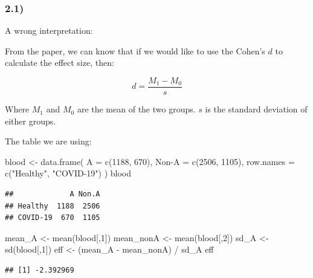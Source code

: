 \documentclass[
]{article}
\newenvironment{Shaded}{\begin{snugshade}}{\end{snugshade}}
\newcommand{\AttributeTok}[1]{\textcolor[rgb]{0.77,0.63,0.00}{#1}}
\newcommand{\DecValTok}[1]{\textcolor[rgb]{0.00,0.00,0.81}{#1}}
\newcommand{\FunctionTok}[1]{\textcolor[rgb]{0.00,0.00,0.00}{#1}}
\newcommand{\NormalTok}[1]{#1}
\newcommand{\OtherTok}[1]{\textcolor[rgb]{0.56,0.35,0.01}{#1}}
\newcommand{\SpecialCharTok}[1]{\textcolor[rgb]{0.00,0.00,0.00}{#1}}
\newcommand{\StringTok}[1]{\textcolor[rgb]{0.31,0.60,0.02}{#1}}
\begin{document}
\hypertarget{section-5}{%
\subsubsection{2.1)}\label{section-5}}

A wrong interpretation:

From the paper, we can know that if we would like to use the Cohen's
\(d\) to calculate the effect size, then:

\[
d = \frac{M_1 - M_0}{s}
\]

Where \(M_1\) and \(M_0\) are the mean of the two groups. \(s\) is the
standard deviation of either groups.

The table we are using:

\begin{Shaded}
\begin{Highlighting}[]
\NormalTok{blood }\OtherTok{\textless{}{-}} \FunctionTok{data.frame}\NormalTok{(}
  \AttributeTok{A =} \FunctionTok{c}\NormalTok{(}\DecValTok{1188}\NormalTok{, }\DecValTok{670}\NormalTok{),}
  \StringTok{\textasciigrave{}}\AttributeTok{Non{-}A}\StringTok{\textasciigrave{}} \OtherTok{=} \FunctionTok{c}\NormalTok{(}\DecValTok{2506}\NormalTok{, }\DecValTok{1105}\NormalTok{),}
  \AttributeTok{row.names =} \FunctionTok{c}\NormalTok{(}\StringTok{"Healthy"}\NormalTok{, }\StringTok{"COVID{-}19"}\NormalTok{)}
\NormalTok{)}
\NormalTok{blood}
\end{Highlighting}
\end{Shaded}

\begin{verbatim}
##             A Non.A
## Healthy  1188  2506
## COVID-19  670  1105
\end{verbatim}

\begin{Shaded}
\begin{Highlighting}[]
\NormalTok{mean\_A }\OtherTok{\textless{}{-}} \FunctionTok{mean}\NormalTok{(blood[,}\DecValTok{1}\NormalTok{])}
\NormalTok{mean\_nonA }\OtherTok{\textless{}{-}} \FunctionTok{mean}\NormalTok{(blood[,}\DecValTok{2}\NormalTok{])}
\NormalTok{sd\_A }\OtherTok{\textless{}{-}} \FunctionTok{sd}\NormalTok{(blood[,}\DecValTok{1}\NormalTok{])}
\NormalTok{eff }\OtherTok{\textless{}{-}}\NormalTok{ (mean\_A }\SpecialCharTok{{-}}\NormalTok{ mean\_nonA) }\SpecialCharTok{/}\NormalTok{ sd\_A}
\NormalTok{eff}
\end{Highlighting}
\end{Shaded}

\begin{verbatim}
## [1] -2.392969
\end{verbatim}
\end{document}
